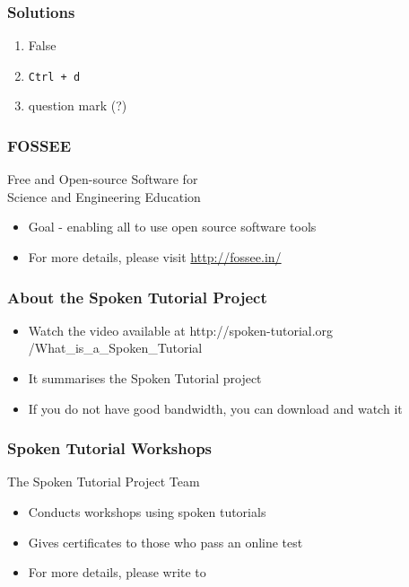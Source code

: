 \documentclass[17pt,compress]{beamer}
\begin{document}
\begin{frame}
\frametitle{Solutions}
\begin{enumerate}
\item False\pause
\item \texttt{Ctrl + d}\pause
\item question mark (?)
\end{enumerate}
\end{frame}
\begin{frame}
\frametitle{FOSSEE}
{\color{blue}Free and Open-source Software for \\Science and Engineering Education} \\
\begin{itemize}
\item Goal - enabling all to use open source software tools
\item For more details, please visit {\color{blue}\url{http://fossee.in/}}
\end{itemize}
\end{frame}
\begin{frame}
\frametitle{About the Spoken Tutorial Project}
\begin{itemize}
\item Watch the video available at {\color{blue}http://spoken-tutorial.org /What\_is\_a\_Spoken\_Tutorial}
\item It summarises the Spoken Tutorial project \pause
\item If you do not have good bandwidth, you can download and watch it
\end{itemize}
\end{frame}
\begin{frame}
\frametitle{Spoken Tutorial Workshops}The Spoken Tutorial Project Team 
\begin{itemize}
\item Conducts workshops using spoken tutorials 
\item Gives certificates to those who pass an online test 
\item For more details, please write to \\ 
\end{itemize}
\end{frame}
\end{document}
